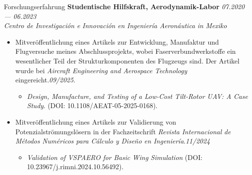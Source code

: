 \documentclass[a4paper]{resume} %
\begin{document}
    
    \begin{rSection}{Forschungserfahrung}
        {\bf Studentische Hilfskraft, Aerodynamik-Labor} \hfill {\itshape 07.2020 --- 06.2023} 
        \\{\textit{Centro de Investigación e Innovación en Ingeniería Aeronáutica in Mexiko}}
        
        \begin{itemize}
        	
	         \item Mitveröffentlichung eines Artikels zur Entwicklung, Manufaktur und Flugversuche meines Abschlussprojekts, wobei Faserverbundwerkstoffe ein wesentlicher Teil der Strukturkomponenten des Flugzeugs sind. Der Artikel wurde bei \textit{Aircraft Engineering and Aerospace Technology} eingereicht.\hfill {\itshape 09/2025}.		
              \begin{itemize}
	         	\item \textit{Design, Manufacture, and Testing of a Low-Cost Tilt-Rotor UAV: A Case Study}. (DOI: 10.1108/AEAT-05-2025-0168). 
	         \end{itemize}

            \item Mitveröffentlichung eines Artikels zur Validierung von Potenzialströmungslösern in der Fachzeitschrift \textit{Revista Internacional de Métodos Numéricos para Cálculo y Diseño en Ingeniería}.\hfill {\itshape 11/2024}
            \begin{itemize}
                \item \textit{Validation of VSPAERO for Basic Wing Simulation} (DOI: 10.23967/j.rimni.2024.10.56492). 
            \end{itemize}
        \end{itemize}
    \end{rSection}
    
\end{document}
